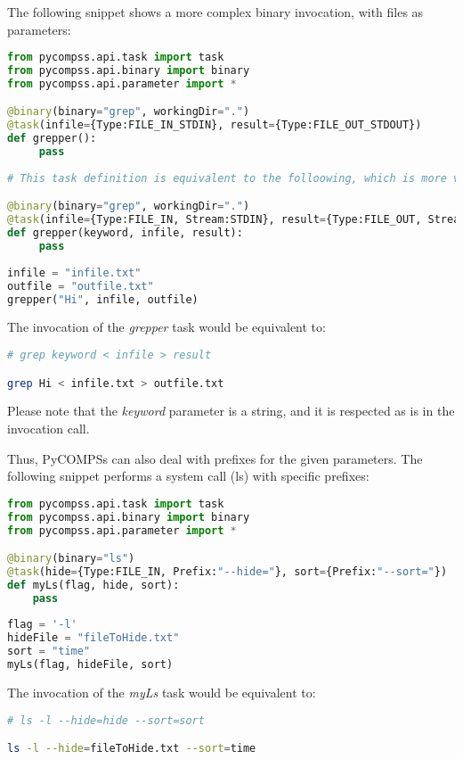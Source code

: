The following snippet shows a more complex binary invocation, with files as parameters:

\begin{lstlisting}[language=python]
from pycompss.api.task import task
from pycompss.api.binary import binary
from pycompss.api.parameter import *

@binary(binary="grep", workingDir=".")
@task(infile={Type:FILE_IN_STDIN}, result={Type:FILE_OUT_STDOUT})
def grepper():
     pass
     
# This task definition is equivalent to the folloowing, which is more verbose:

@binary(binary="grep", workingDir=".")
@task(infile={Type:FILE_IN, Stream:STDIN}, result={Type:FILE_OUT, Stream:STDOUT})
def grepper(keyword, infile, result):
     pass
     
infile = "infile.txt"
outfile = "outfile.txt"
grepper("Hi", infile, outfile)
\end{lstlisting}

The invocation of the {\it grepper} task would be equivalent to:

\begin{lstlisting}[language=bash]
# grep keyword < infile > result

grep Hi < infile.txt > outfile.txt
\end{lstlisting}

Please note that the {\it keyword} parameter is a string, and it is respected as is in the invocation call.

Thus, PyCOMPSs can also deal with prefixes for the given parameters. 
The following snippet performs a system call (ls) with specific prefixes:

\begin{lstlisting}[language=python]
from pycompss.api.task import task
from pycompss.api.binary import binary
from pycompss.api.parameter import *

@binary(binary="ls")
@task(hide={Type:FILE_IN, Prefix:"--hide="}, sort={Prefix:"--sort="})
def myLs(flag, hide, sort):
    pass
    
flag = '-l'
hideFile = "fileToHide.txt"
sort = "time"
myLs(flag, hideFile, sort)
\end{lstlisting}

The invocation of the {\it myLs} task would be equivalent to:

\begin{lstlisting}[language=bash]
# ls -l --hide=hide --sort=sort

ls -l --hide=fileToHide.txt --sort=time
\end{lstlisting}

